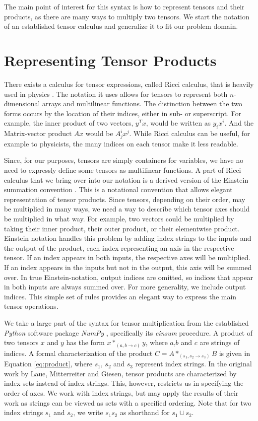 \documentclass[12pt, a4paper]{report}
\begin{document}
The main point of interest for this syntax is how to represent tensors and their products, as there are many ways to multiply two tensors.
We start the notation of an established tensor calculus and generalize it to fit our problem domain.

\section{Representing Tensor Products}
There exists a calculus for tensor expressions, called Ricci calculus, that is heavily used in physics \cite{ricci}. 
The notation it uses allows for tensors to represent both $n$-dimensional arrays and multilinear functions.
The distinction between the two forms occurs by the location of their indices, either in sub- or superscript.
For example, the inner product of two vectors, $y^Tx$, would be written as $y_ix^i$. And the Matrix-vector product $Ax$ would be $A^i_jx^j$.
While Ricci calculus can be useful, for example to physicists, the many indices on each tensor make it less readable.

Since, for our purposes, tensors are simply containers for variables, we have no need to expressly define some tensors as multilinear functions.
A part of Ricci calculus that we bring over into our notation is a derived version of the Einstein summation convention \cite{einstein}.
This is a notational convention that allows elegant representation of tensor products.
Since tensors, depending on their order, may be multiplied in many ways, we need a way to describe which tensor axes should be multiplied in what way.
For example, two vectors could be multiplied by taking their inner product, their outer product, or their elementwise product.
Einstein notation handles this problem by adding index strings to the inputs and the output of the product, each index representing an axis in the respective tensor.
If an index appears in both inputs, the respective axes will be multiplied.
If an index appears in the inputs but not in the output, this axis will be summed over.
In true Einstein-notation, output indices are omitted, so indices that appear in both inputs are always summed over. 
For more generality, we include output indices.
This simple set of rules provides an elegant way to express the main tensor operations.

We take a large part of the syntax for tensor multiplication from the established \textit{Python} software package \textit{NumPy} \cite{numpy}, specifically its \textit{einsum} procedure.
A product of two tensors $x$ and $y$ has the form $x*_{(a,b \rightarrow c)}y$, where $a$,$b$ and $c$ are strings of indices.
A formal characterization of the product $C = A *_{(s_1,s_2 \rightarrow s_3)} B$ is given in Equation \ref{eq:product}, where $s_1$, $s_2$ and $s_3$ represent index strings.
In the original work \cite{tensorpaper} by Laue, Mitterreiter and Giesen, tensor products are characterized by index sets instead of index strings.
This, however, restricts us in specifying the order of axes.
We work with index strings, but may apply the results of their work as strings can be viewed as sets with a specified ordering.
Note that for two index strings $s_1$ and $s_2$, we write $s_1 s_2$ as shorthand for $s_1 \cup s_2$.
\end{document}
